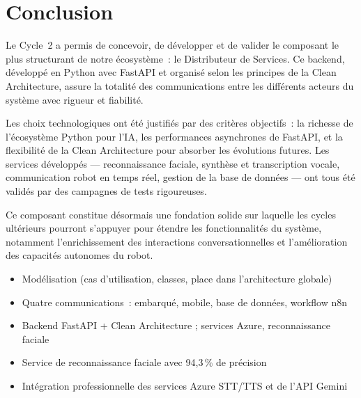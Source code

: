 \documentclass[a4paper,12pt]{report}
\begin{document}
	\section{Conclusion}
	
	Le Cycle~2 a permis de concevoir, de développer et de valider
	le composant le plus structurant de notre écosystème~: le
	Distributeur de Services. Ce backend, développé en Python avec
	FastAPI et organisé selon les principes de la Clean Architecture,
	assure la totalité des communications entre les différents
	acteurs du système avec rigueur et fiabilité.
	
	Les choix technologiques ont été justifiés par des critères
	objectifs~: la richesse de l'écosystème Python pour l'IA, les
	performances asynchrones de FastAPI, et la flexibilité de la
	Clean Architecture pour absorber les évolutions futures.
	Les services développés — reconnaissance faciale, synthèse et
	transcription vocale, communication robot en temps réel, gestion
	de la base de données — ont tous été validés par des campagnes
	de tests rigoureuses.
	
	Ce composant constitue désormais une fondation solide sur
	laquelle les cycles ultérieurs pourront s'appuyer pour étendre
	les fonctionnalités du système, notamment l'enrichissement des
	interactions conversationnelles et l'amélioration des capacités
	autonomes du robot.
	
	\begin{tcolorbox}[colback=blue!5!white, colframe=blue!60!black,
		title=\textbf{Points clés du Cycle 2}]
		\begin{itemize}[noitemsep]
			\item Modélisation (cas d'utilisation, classes, place dans l'architecture globale)
			\item Quatre communications~: embarqué, mobile, base de données, workflow n8n
			\item Backend FastAPI + Clean Architecture ; services Azure, reconnaissance faciale
			\item Service de reconnaissance faciale avec 94{,}3\,\% de précision
			\item Intégration professionnelle des services Azure STT/TTS
			et de l'API Gemini
		\end{itemize}
	\end{tcolorbox}
	
\end{document}

